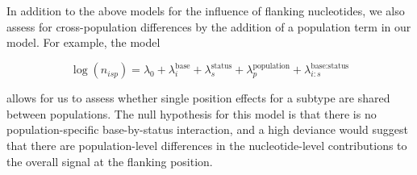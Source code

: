 In addition to the above models for the influence of flanking nucleotides, we also assess for cross-population differences by the addition of a population term in our model. For example, the model 

$$
\log(n_{isp}) = \lambda_0 + \lambda_{i}^{\textrm{base}} + \lambda_{s}^{\textrm{status}} + \lambda_p^{\textrm{population}} + \lambda_{i:s}^{\textrm{base:status}}
$$

allows for us to assess whether single position effects for a subtype are shared between populations. The null hypothesis for this model is that there is no population-specific base-by-status interaction, and a high deviance would suggest that there are population-level differences in the nucleotide-level contributions to the overall signal at the flanking position.

